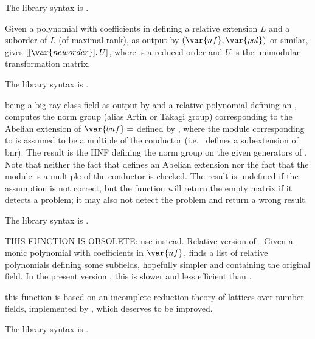 The library syntax is .

\label{se:rnflllgram}
Given a polynomial
 with coefficients in  defining a relative extension $L$ and
a suborder  of $L$ (of maximal rank), as output by
$(\var{nf},\var{pol})$ or similar, gives
$[[\var{neworder}],U]$, where  is a reduced order and $U$ is
the unimodular transformation matrix.

The library syntax is .

\label{se:rnfnormgroup}
 being a big ray
class field as output by  and  a relative polynomial
defining an , computes the norm group (alias Artin
or Takagi group) corresponding to the Abelian extension of
$\var{bnf}=$
defined by , where the module corresponding to  is assumed
to be a multiple of the conductor (i.e.~ defines a subextension of
bnr). The result is the HNF defining the norm group on the given generators
of . Note that neither the fact that  defines an
Abelian extension nor the fact that the module is a multiple of the conductor
is checked. The result is undefined if the assumption is not correct,
but the function will return the empty matrix \kbd{[;]} if it detects a
problem; it may also not detect the problem and return a wrong result.

The library syntax is .

\label{se:rnfpolred}
THIS FUNCTION IS OBSOLETE: use  instead.
Relative version of . Given a monic polynomial  with
coefficients in $\var{nf}$, finds a list of relative polynomials defining some
subfields, hopefully simpler and containing the original field. In the present
version \vers, this is slower and less efficient than .

 this function is based on an incomplete reduction
theory of lattices over number fields, implemented by , which
deserves to be improved.

The library syntax is .

